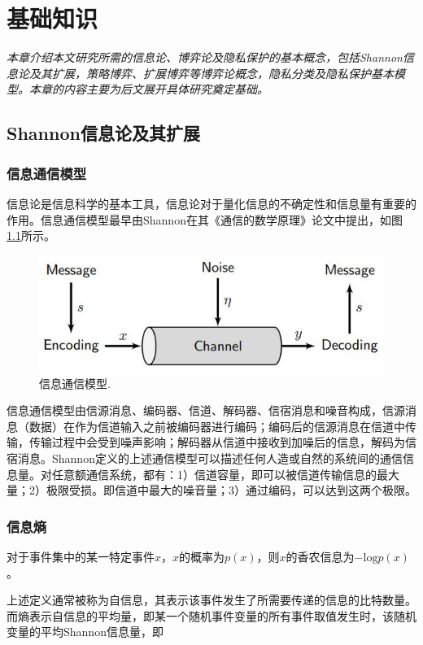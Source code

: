 \chapter{基础知识}
\label{chap:preliminary}

\textit{}

\textit{本章介绍本文研究所需的信息论、博弈论及隐私保护的基本概念，包括Shannon信息论及其扩展，策略博弈、扩展博弈等博弈论概念，隐私分类及隐私保护基本模型。本章的内容主要为后文展开具体研究奠定基础。}
\section{Shannon信息论及其扩展}

\subsection{信息通信模型}
信息论\cite{shannon1948mathematical,
	stone2018information}是信息科学的基本工具，信息论对于量化信息的不确定性和信息量有重要的作用。信息通信模型最早由Shannon在其《通信的数学原理》论文中提出，如图\ref{fig:communication-model}所示。

\begin{figure}[htbp]
	\centering
	\includegraphics[width = 0.6\linewidth]{./figures/shannon-communicaiton-model.jpg}
	\caption{信息通信模型\cite{stone2018information}.
	}
	\label{fig:communication-model}
\end{figure}

信息通信模型\cite{stone2018information}由信源消息、编码器、信道、解码器、信宿消息和噪音构成，信源消息（数据）在作为信道输入之前被编码器进行编码；编码后的信源消息在信道中传输，传输过程中会受到噪声影响；解码器从信道中接收到加噪后的信息，解码为信宿消息。Shannon定义的上述通信模型可以描述任何人造或自然的系统间的通信信息量。对任意额通信系统，都有：1）信道容量，即可以被信道传输信息的最大量；2）极限受损。即信道中最大的噪音量；3）通过编码，可以达到这两个极限。



\subsection{信息熵}


\begin{definition}
	对于事件集中的某一特定事件$x$，$x$的概率为$p(x)$，则$x$的香农信息为$-\text{log}p(x)$。
\end{definition}
上述定义通常被称为自信息，其表示该事件发生了所需要传递的信息的比特数量。而熵表示自信息的平均量，即某一个随机事件变量的所有事件取值发生时，该随机变量的平均Shannon信息量，即

